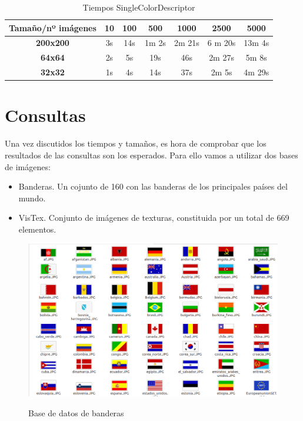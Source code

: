 \begin{table}[H]
\centering
\begin{tabular}{|c|c|c|c|c|c|c|}
\hline
\textbf{Tamaño/nº imágenes} & \textbf{10} & \textbf{100} & \textbf{500} & \textbf{1000} & \textbf{2500} & \textbf{5000} \\ \hline
\textbf{200x200}            & 3s          & 14s          & 1m 2s        & 2m 21s        & 6 m 20s       & 13m 4s        \\ \hline
\textbf{64x64}              & 2s          & 5s           & 19s          & 46s           & 2m 27s        & 5m 8s         \\ \hline
\textbf{32x32}              & 1s          & 4s           & 14s          & 37s           & 2m 5s         & 4m 29s        \\ \hline
\end{tabular}
\label{Tiempos SingleColorDescriptor}
\caption{Tiempos SingleColorDescriptor}
\end{table}

\section{Consultas}

Una vez discutidos los tiempos y tamaños, es hora de comprobar que los resultados de las consultas son los esperados. Para ello vamos a utilizar dos bases de imágenes:\\

\begin{itemize}

\item Banderas. Un cojunto de 160 con las banderas de los principales países del mundo.

\item VisTex. Conjunto de imágenes de texturas, constituida por un total de 669 elementos.

\end{itemize}

\begin{figure}[H] %
\centering
\includegraphics[scale=0.4]{imagenes/banderas.png}  %
\label{banderas}
\caption{Base de datos de banderas}
\end{figure}

